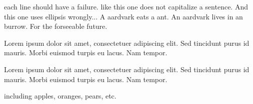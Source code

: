 each line should have a failure.  like this one does not capitalize a sentence.
And this one uses ellipsis wrongly...
A aardvark eats a ant.
An aardvark lives in an burrow.
For the forseeable future.
\caption{Lorem ipsum dolor sit amet, consectetuer adipiscing elit. Sed tincidunt purus id mauris. Morbi euismod turpis eu lacus. Nam tempor.}
\caption{\label{thelabel}Lorem ipsum dolor sit amet, consectetuer adipiscing elit. Sed tincidunt purus id mauris. Morbi euismod turpis eu lacus. Nam tempor.}
including apples, oranges, pears, etc.
